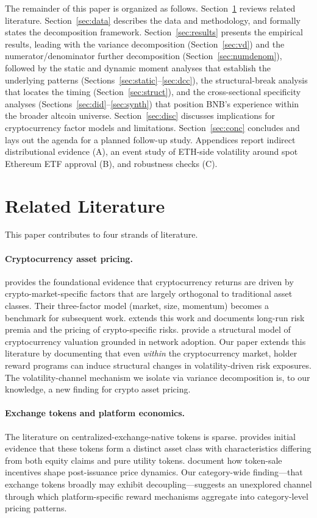 \documentclass[11pt,a4paper]{article}
\begin{document}
The remainder of this paper is organized as follows. Section~\ref{sec:lit} reviews related literature. Section~\ref{sec:data} describes the data and methodology, and formally states the decomposition framework. Section~\ref{sec:results} presents the empirical results, leading with the variance decomposition (Section~\ref{sec:vd}) and the numerator/denominator further decomposition (Section~\ref{sec:numdenom}), followed by the static and dynamic moment analyses that establish the underlying patterns (Sections~\ref{sec:static}--\ref{sec:dcc}), the structural-break analysis that locates the timing (Section~\ref{sec:struct}), and the cross-sectional specificity analyses (Sections~\ref{sec:did}--\ref{sec:synth}) that position BNB's experience within the broader altcoin universe. Section~\ref{sec:disc} discusses implications for cryptocurrency factor models and limitations. Section~\ref{sec:conc} concludes and lays out the agenda for a planned follow-up study. Appendices report indirect distributional evidence (A), an event study of ETH-side volatility around spot Ethereum ETF approval (B), and robustness checks (C).

\section{Related Literature} \label{sec:lit}

This paper contributes to four strands of literature.

\paragraph{Cryptocurrency asset pricing.} \citet{liu2021} provides the foundational evidence that cryptocurrency returns are driven by crypto-market-specific factors that are largely orthogonal to traditional asset classes. Their three-factor model (market, size, momentum) becomes a benchmark for subsequent work. \citet{liu2024} extends this work and documents long-run risk premia and the pricing of crypto-specific risks. \citet{sockin2023} provide a structural model of cryptocurrency valuation grounded in network adoption. Our paper extends this literature by documenting that even \emph{within} the cryptocurrency market, holder reward programs can induce structural changes in volatility-driven risk exposures. The volatility-channel mechanism we isolate via variance decomposition is, to our knowledge, a new finding for crypto asset pricing.

\paragraph{Exchange tokens and platform economics.} The literature on centralized-exchange-native tokens is sparse. \citet{lee2023} provides initial evidence that these tokens form a distinct asset class with characteristics differing from both equity claims and pure utility tokens. \citet{howell2020} document how token-sale incentives shape post-issuance price dynamics. Our category-wide finding---that exchange tokens broadly may exhibit decoupling---suggests an unexplored channel through which platform-specific reward mechanisms aggregate into category-level pricing patterns.
\end{document}
